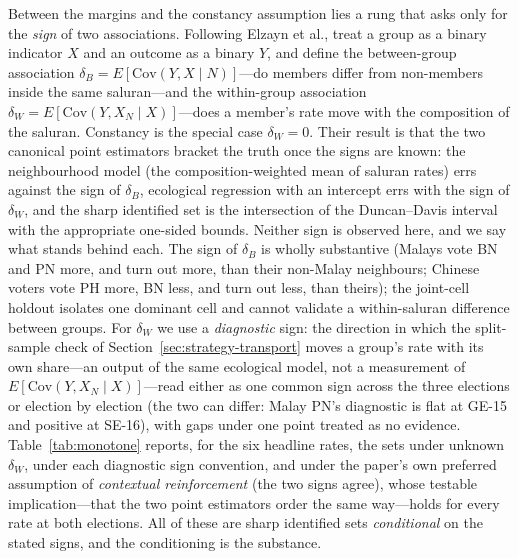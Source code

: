 \documentclass[11pt]{article}
\begin{document}
Between the margins and the constancy assumption lies a rung that asks only for the \emph{sign} of two associations. Following Elzayn et al.\cite{elzayn2026}, treat a group as a binary indicator $X$ and an outcome as a binary $Y$, and define the between-group association $\delta_B = E[\mathrm{Cov}(Y, X \mid N)]$---do members differ from non-members inside the same saluran---and the within-group association $\delta_W = E[\mathrm{Cov}(Y, X_N \mid X)]$---does a member's rate move with the composition of the saluran. Constancy is the special case $\delta_W = 0$. Their result is that the two canonical point estimators bracket the truth once the signs are known: the neighbourhood model (the composition-weighted mean of saluran rates) errs against the sign of $\delta_B$, ecological regression with an intercept errs with the sign of $\delta_W$, and the sharp identified set is the intersection of the Duncan--Davis interval with the appropriate one-sided bounds. Neither sign is observed here, and we say what stands behind each. The sign of $\delta_B$ is wholly substantive (Malays vote BN and PN more, and turn out more, than their non-Malay neighbours; Chinese voters vote PH more, BN less, and turn out less, than theirs); the joint-cell holdout isolates one dominant cell and cannot validate a within-saluran difference between groups. For $\delta_W$ we use a \emph{diagnostic} sign: the direction in which the split-sample check of Section~\ref{sec:strategy-transport} moves a group's rate with its own share---an output of the same ecological model, not a measurement of $E[\mathrm{Cov}(Y, X_N \mid X)]$---read either as one common sign across the three elections or election by election (the two can differ: Malay PN's diagnostic is flat at GE-15 and positive at SE-16), with gaps under one point treated as no evidence. Table~\ref{tab:monotone} reports, for the six headline rates, the sets under unknown $\delta_W$, under each diagnostic sign convention, and under the paper's own preferred assumption of \emph{contextual reinforcement} (the two signs agree), whose testable implication---that the two point estimators order the same way---holds for every rate at both elections. All of these are sharp identified sets \emph{conditional} on the stated signs, and the conditioning is the substance.


\end{document}
